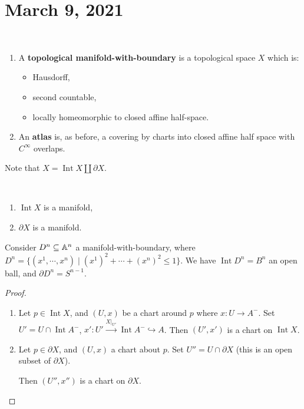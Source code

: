 \section{March 9, 2021}
\begin{definition}[]\,
    \begin{enumerate}[label=(\arabic*)]
        \item A \textbf{topological manifold-with-boundary} is a topological space $X$ which is:
    \begin{itemize}
        \setlength\itemsep{-.2em}
        \item Hausdorff,
        \item second countable,
        \item locally homeomorphic to closed affine half-space.
    \end{itemize}
\item An \textbf{atlas} is, as before, a covering by charts into closed affine half space with $C^{\infty}$ overlaps.
    \end{enumerate}
    Note that $X=\operatorname{Int}X \amalg \partial X$.
\end{definition}
\begin{prop}
    \,
    \begin{enumerate}[label=(\arabic*)]
        \item $\operatorname{Int}X$ is a manifold,
        \item $\partial X$ is a manifold.
    \end{enumerate}
\end{prop}
\begin{example}
    Consider $D^n  \subseteq \mathbb{A}^n $ a manifold-with-boundary, where $D^n =\{(x^1,\cdots ,x^n )\mid (x^1)^2+\cdots + (x^n )^2\leq 1\} $. We have $\operatorname{Int}D^n =B^n $ an open ball, and $\partial D^n =S^{n-1}$.
\end{example}
\begin{proof}
    \,
    \begin{enumerate}[label=(\arabic*)]
        \item Let $p \in \operatorname{Int}X$, and $(U,x)$ be a chart around $p$ where $x \colon U \to A^-$. Set $U'= U \cap \operatorname{Int}A^-$, $x' \colon U' \overset{X|_{U'}}{\longrightarrow} \operatorname{Int}A^- \hookrightarrow A$. Then $(U',x')$ is a chart on $\operatorname{Int}X$.
        \item Let $p \in \partial X$, and $(U,x)$ a chart about $p$. Set $U ''=U \cap \partial X$ (this is an open subset of $\partial X$). 
            \begin{figure}[H]
            \centering
            \end{figure}
    Then $(U'',x'')$ is a chart on $\partial X$.\qedhere
    \end{enumerate}
\end{proof}

